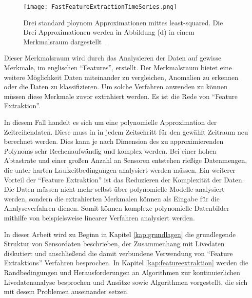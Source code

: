 \begin{figure}
  \centering
  \texttt{[image: FastFeatureExtractionTimeSeries.png]}
  \caption{Drei standard ploynom Approximationen mittes least-squared. Die Drei Approximationen werden in Abbildung (d) in einem Merkmalsraum dargestellt~\cite{gensler2015fast}.} 
  \label{fig:FFETimeSeries}
\end{figure}

Dieser Merkmalsraum wird durch das Analysieren der Daten auf gewisse Merkmale, im englischen \enquote{Features}, erstellt.
Der Merkmalsraum bietet eine weitere Möglichkeit Daten miteinander zu vergleichen, Anomalien zu erkennen oder die Daten zu klassifizieren. 
Um solche Verfahren anwenden zu können müssen diese Merkmale zuvor extrahiert werden. 
Es ist die Rede von \enquote{Feature Extraktion}.

In diesem Fall handelt es sich um eine polynomielle Approximation der Zeitreihendaten. 
Diese muss in in jedem Zeitschritt für den gewählt Zeitraum neu berechnet werden. 
Dies kann je nach Dimension des zu approximierenden Polynoms sehr Rechenaufwändig und komplex werden.
Bei einer hohen Abtastrate und einer großen Anzahl an Sensoren entstehen rießige Datenmengen, die unter harten Laufzeitbedingungen analysiert werden müssen.
Ein weiterer Vorteil der \enquote{Feature Extraktion} ist das Reduzieren der Komplexität der Daten. Die Daten müssen nicht mehr selbst über polynomielle Modelle analysiert werden, sondern die extrahierten Merkmalen können als Eingabe für die Analyseverfahren dienen. Somit können komplexe polynomielle Datenbilder mithilfe von beispielsweise linearer Verfahren analysiert werden.

In dieser Arbeit wird zu Beginn in Kapitel \ref{kap:grundlagen} die grundlegende Struktur von Sensordaten beschrieben, der Zusammenhang mit Livedaten diskutiert und anschließend die damit verbundene Verwendung von \enquote{Feature Extraktions} Verfahren besprochen. 
In Kapitel \ref{kap:featureextraktion} werden die Randbedingungen und Herausforderungen an Algorithmen zur kontinuierlichen Livedatenanalyse besprochen und Ansätze sowie Algorithmen vorgestellt, die sich mit desem Problemen auseinander setzen.